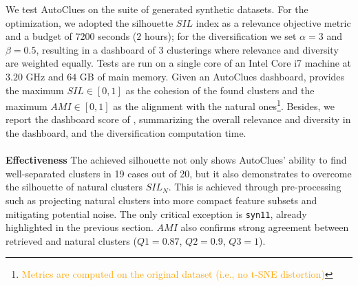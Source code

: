 \documentclass[runningheads]{llncs}
\begin{document}
We test AutoClues on the suite of generated synthetic datasets.
For the optimization, we adopted the silhouette $SIL$ index as a relevance objective metric and a budget of $7200$ seconds ($2$ hours); for the diversification we set $\alpha=3$ and $\beta=0.5$, resulting in a dashboard of $3$ clusterings where relevance and diversity are weighted equally.
Tests are run on a single core of an Intel Core i7 machine at $3.20$ GHz and $64$ GB of main memory.
%
Given an AutoClues dashboard,  provides
the maximum $SIL\in [0, 1]$ as the cohesion of the found clusters and the maximum $AMI \in [0, 1]$ as the alignment with the natural ones\footnote{\textcolor{orange}{Metrics are computed on the original dataset (i.e., no t-SNE distortion)}}. Besides, we report the dashboard score of , summarizing the overall relevance and diversity in the dashboard, and the diversification computation time.
\\
\\
\textbf{Effectiveness}
The achieved silhouette not only shows AutoClues' ability to find well-separated clusters in 19 cases out of 20, but it also demonstrates to overcome the silhouette of natural clusters $SIL_N$. 
This is achieved through pre-processing such as projecting natural clusters into more compact feature subsets and mitigating potential noise.
The only critical exception is \texttt{syn11}, already highlighted in the previous section. 
$AMI$ also confirms strong agreement between retrieved and natural clusters ($Q1=0.87$, $Q2=0.9$, $Q3=1$). 
\end{document}
